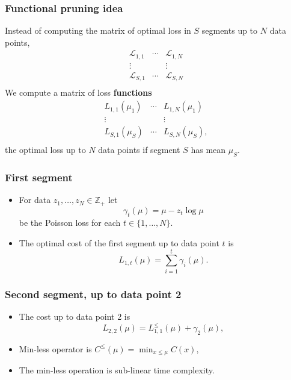 \documentclass{beamer}
\newcommand{\ZZ}{\mathbb Z}
\begin{document}

\begin{frame}
  \frametitle{Functional pruning idea}
  Instead of computing the matrix of optimal loss in $S$ segments up
  to $N$ data points,
$$
\begin{array}{ccc}
  \mathcal L_{1,1} & \cdots &   \mathcal L_{1,N}\\
  \vdots &  & \vdots\\
  \mathcal L_{S,1} & \cdots & \mathcal L_{S,N}\\
\end{array}
$$
We compute a matrix of loss \textbf{functions}
$$
\begin{array}{ccc}
   L_{1,1}(\mu_1) & \cdots & L_{1,N}(\mu_1)\\
  \vdots &  & \vdots\\
   L_{S,1}(\mu_S) & \cdots & L_{S,N}(\mu_S),\\
\end{array}
$$
the optimal loss up to $N$ data points if segment $S$ has mean
$\mu_S$.
\end{frame}

\begin{frame}
  \frametitle{First segment}
  \begin{itemize}
  \item   For data $z_1, \dots, z_N\in\ZZ_+$ let
  \begin{equation*}
    \gamma_t(\mu) = \mu - z_t \log \mu
  \end{equation*}
  be the Poisson loss for each $t\in\{1, \dots, N\}$.
\item
  The optimal cost of the first segment up to data point $t$ is
  \begin{equation*}
    \label{eq:C1b}
    L_{1,t}(\mu) = \sum_{i=1}^t \gamma_i(\mu).
  \end{equation*}
  \end{itemize}
\end{frame}

\begin{frame}
  \frametitle{Second segment, up to data point 2}
  \begin{itemize}
  \item The cost up to data point 2 is
\begin{equation*}
  \label{eq:C22}
  L_{2,2}(\mu) = L_{1,1}^{\leq}(\mu) + \gamma_2(\mu),
\end{equation*}
\item Min-less operator is $C^\leq(\mu) = \min_{x\leq\mu} C(x),$
    \begin{center}
      
    \end{center}
\item The min-less operation is sub-linear time complexity.
\end{itemize}
\end{frame}
\end{document}

